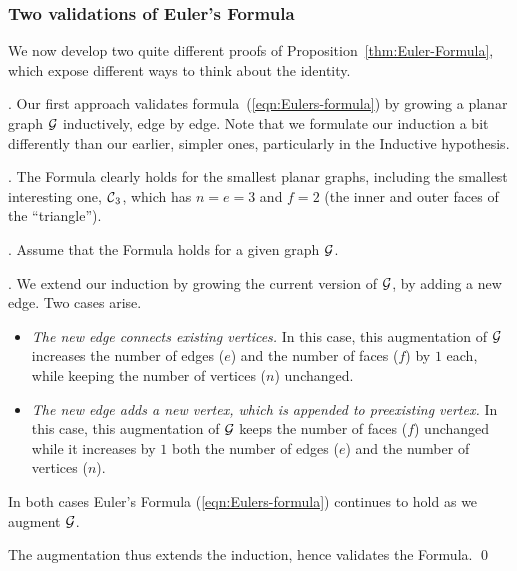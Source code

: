 \subsubsection{Two validations of Euler's Formula}
\label{subsec:validationEulerFormula}

We now develop two quite different proofs of Proposition~\ref{thm:Euler-Formula}, which expose different ways to think about the identity.

\medskip


. 
Our first approach validates formula~(\ref{eqn:Eulers-formula}) by growing a planar graph $\mbox{$\cal G$}$
inductively, edge by edge.  Note that we formulate our induction a bit differently than our earlier, simpler ones, particularly in the Inductive hypothesis.

\smallskip

.
The Formula clearly holds for the smallest planar graphs, including the smallest interesting one, $\mbox{$\cal C$}_3$, which has $n = e = 3$ and $f =2$ (the inner and outer faces of the ``triangle'').

\smallskip

.
Assume that the Formula holds for a given graph $\mbox{$\cal G$}$.

\smallskip

.
We extend our induction by growing the current version of $\mbox{$\cal G$}$, by adding a new edge.  Two cases arise.
\begin{itemize}
\item
{\it The new edge connects existing vertices.}
In this case, this augmentation of $\mbox{$\cal G$}$ increases the number of edges ($e$) and the number of faces ($f$) by $1$ each, while keeping the number of vertices ($n$) unchanged.

\medskip\item
{\it The new edge adds a new vertex, which is appended to preexisting vertex.}
In this case, this augmentation of $\mbox{$\cal G$}$ keeps the number of faces ($f$) unchanged while
it increases by $1$ both the number of edges ($e$) and the number of vertices ($n$). 
\end{itemize}
In both cases Euler's Formula (\ref{eqn:Eulers-formula}) continues to hold as we augment $\mbox{$\cal G$}$.  

The augmentation thus extends the induction, hence validates the Formula.  \qed

